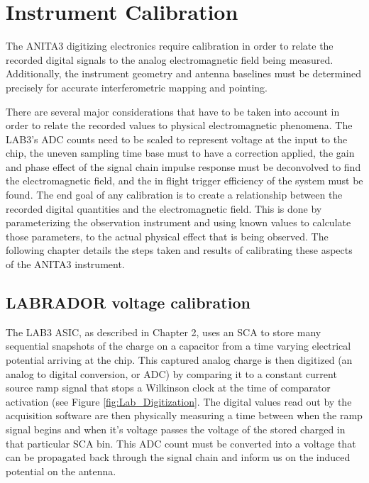 	
\chapter{Instrument Calibration}

	The ANITA3 digitizing electronics require calibration in order to relate the recorded digital signals to the analog electromagnetic field being measured.  Additionally, the instrument geometry and antenna baselines must be determined precisely for accurate interferometric mapping and pointing.  
	
	There are several major considerations that have to be taken into account in order to relate the recorded values to physical electromagnetic phenomena.  The LAB3's ADC counts need to be scaled to represent voltage at the input to the chip, the uneven sampling time base must to have a correction applied, the gain and phase effect of the signal chain impulse response must be deconvolved to find the electromagnetic field, and the in flight trigger efficiency of the system must be found.  The end goal of any calibration is to create a relationship between the recorded digital quantities and the electromagnetic field.  This is done by parameterizing the observation instrument and using known values to calculate those parameters, to the actual physical effect that is being observed.  The following chapter details the steps taken and results of calibrating these aspects of the ANITA3 instrument.
	

	
\section{LABRADOR voltage calibration}
		The LAB3 ASIC, as described in Chapter 2, uses an SCA to store many sequential snapshots of the charge on a capacitor from a time varying electrical potential arriving at the chip.  This captured analog charge is then digitized (an analog to digital conversion, or ADC) by comparing it to a constant current source ramp signal that stops a Wilkinson clock at the time of comparator activation (see Figure \ref{fig:Lab_Digitization}.  The digital values read out by the acquisition software are then physically measuring a time between when the ramp signal begins and when it's voltage passes the voltage of the stored charged in that particular SCA bin.  This ADC count must be converted into a voltage that can be propagated back through the signal chain and inform us on the induced potential on the antenna.

